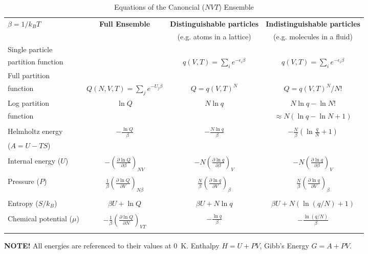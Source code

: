 \documentclass[11pt]{article}
\begin{document}
\begin{table}\small
  \begin{center}
    \caption{Equations of the Canoncial ($NVT$) Ensemble}
    \label{Canonical}
    \begin{tabular}[h]{lccc}
      \hline
$\beta=1/k_BT$ & {\bf Full Ensemble} & {\bf Distinguishable particles} & {\bf Indistinguishable
particles} \\
               &               & (e.g. atoms in a lattice) & (e.g. molecules in
               a fluid) \\
\hline
Single particle & & & \\partition function& & $\displaystyle q(V,T) = \sum_i
e^{-\epsilon_i\beta} $& $\displaystyle q(V,T) = \sum_i e^{-\epsilon_i\beta} $ \\
Full partition & & & \\function & $\displaystyle Q(N,V,T) = \sum_j e^{-U_j\beta} $ &
$\displaystyle Q = q(V,T)^N $ & $\displaystyle Q = q(V,T)^N/N! $ \\
Log partition &  $\ln Q$ & $N\ln q$ & $ N\ln q - \ln N! $\\
function & & & $\approx N(\ln q - \ln N +1)$ \\ & & & \\
Helmholtz energy & $\displaystyle -\frac{\ln Q}{\beta}$ & $\displaystyle
-\frac{N\ln q}{\beta}$ & $\displaystyle -\frac{N}{\beta}\left (\ln\frac{q}{N} +
  1 \right ) $ \\
($A=U-TS$) & & & \\ & & &  \\
Internal energy ($U$)& $\displaystyle -\left (\frac{\partial\ln
    Q}{\partial\beta}\right )_{NV}$ & $\displaystyle -N\left (\frac{\partial\ln
    q}{\partial\beta}\right )_{V}$ &  $\displaystyle -N\left (\frac{\partial\ln
    q}{\partial\beta}\right )_{V}$ \\ & & & \\
Pressure ($P$) & $\displaystyle  \frac{1}{\beta}\left (\frac{\partial\ln
    Q}{\partial V}\right )_{N\beta}$ & $\displaystyle \frac{N}{\beta}\left (\frac{\partial\ln
    q}{\partial V}\right )_{\beta}$ &  $\displaystyle \frac{N}{\beta}\left (\frac{\partial\ln
    q}{\partial V}\right )_{\beta}$ \\ & & & \\

Entropy ($S/k_B$) & $ \beta U + \ln Q$ & $\beta U + N \ln q$ & $\beta U +
N\left ( \ln(q/N) + 1\right )$ \\ & & & \\
Chemical potential ($\mu$) & $\displaystyle -\frac{1}{\beta}\left ( \frac{\partial \ln
    Q}{\partial N}\right )_{VT} $& $\displaystyle -\frac{\ln q}{\beta}$ & $\displaystyle
-\frac{\ln (q/N)}{\beta}$ \\ & & & \\
\hline
    \end{tabular}
{\bf NOTE!} All energies are referenced to their values at 0~K.  Enthalpy $H=U+PV$, Gibb's
Energy $G=A+PV$.
  \end{center}
\end{table}
\end{document}

